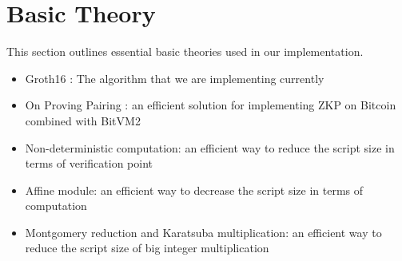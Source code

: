 \section{Basic Theory} \label{sec:basic theory}
This section outlines essential basic theories used in our implementation.

\begin{itemize}
    \item Groth16 \cite{website:Groth16}: The algorithm that we are implementing currently
    \item On Proving Pairing \cite{website:On-proving-pairing}: an efficient solution for implementing ZKP on Bitcoin combined with BitVM2 \cite{website:BitVM2}
    \item Non-deterministic computation: an efficient way to reduce the script size in terms of verification point
    \item Affine module: an efficient way to decrease the script size in terms of computation
    \item Montgomery reduction and Karatsuba multiplication: an efficient way to reduce the script size of big integer multiplication
\end{itemize}






